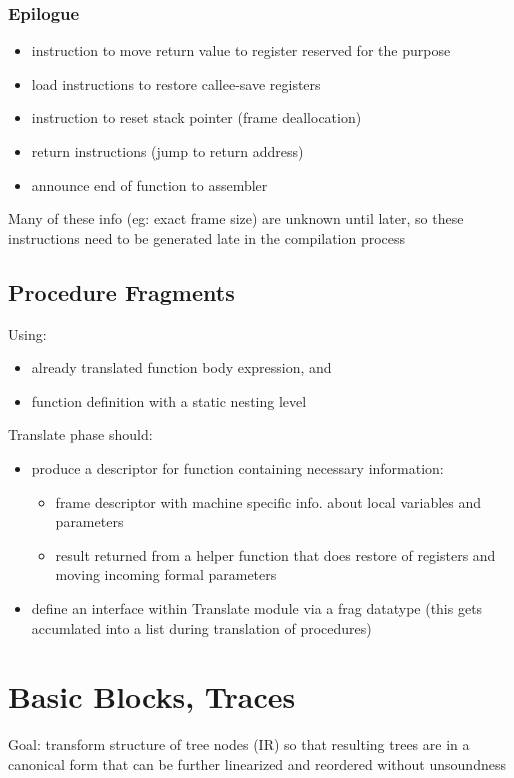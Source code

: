 \documentclass[8pt]{extarticle}
\begin{document}
\begin{multicols*}{2}
  \subsubsection{Epilogue}
  \begin{itemize}
  \item instruction to move return value to register reserved for the purpose
  \item load instructions to restore callee-save registers
  \item instruction to reset stack pointer (frame deallocation)
  \item return instructions (jump to return address)
  \item announce end of function to assembler
  \end{itemize}

  Many of these info (eg: exact frame size) are unknown until later, so these instructions need to be generated late in the compilation process

  \subsection{Procedure Fragments}
  Using:
  \begin{itemize}
  \item already translated function body expression, and
  \item function definition with a static nesting level
  \end{itemize}
    
  Translate phase should:
  \begin{itemize}
  \item produce a descriptor for function containing necessary information:
    \begin{itemize}
    \item frame descriptor with machine specific info. about local variables and parameters
    \item result returned from a helper function that does restore of registers and moving incoming formal parameters
    \end{itemize}
  \item define an interface within Translate module via a frag datatype (this gets accumlated into a list during translation of procedures)
  \end{itemize}
  
  \vfill\null
  \columnbreak

  \section{Basic Blocks, Traces}
  Goal: transform structure of tree nodes (IR) so that resulting trees are in a canonical form that can be further linearized and reordered without unsoundness


\end{multicols*}
\end{document}
